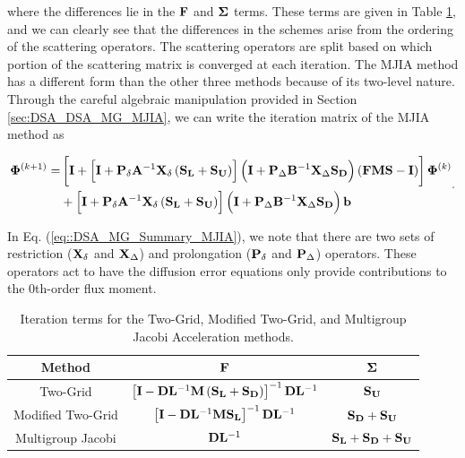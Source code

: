 \noindent where the differences lie in the ${\bf F}$ and  ${\bf \Sigma}$ terms. These terms are given in Table \ref{tab::DSA_DSA_MG_Summary_diffterms}, and we can clearly see that the differences in the schemes arise from the ordering of the scattering operators. The scattering operators are split based on which portion of the scattering matrix is converged at each iteration. The MJIA method has a different form than the other three methods because of its two-level nature. Through the careful algebraic manipulation provided in Section \ref{sec:DSA_DSA_MG_MJIA}, we can write the iteration matrix of the MJIA method as

\begin{equation}
\label{eq::DSA_MG_Summary_MJIA}
\begin{aligned}
{\bf \Phi}^{(k+1)} = & \left[ {\bf I} +\left[ {\bf I}+ {\bf P}_{\delta}{\bf A}^{-1}  {\bf X}_{\delta}\left(   {\bf S_L} +  {\bf S_U} \right) \right]    \left(  {\bf I} + {\bf P}_{\Delta} {\bf B}^{-1} {\bf X}_{\Delta} {\bf S_D} \right) \left(   {\bf F}  {\bf M} {\bf S}  - {\bf I} \right)   \right]{\bf \Phi}^{(k)} \\
&+  \left[ {\bf I}+ {\bf P}_{\delta}{\bf A}^{-1}  {\bf X}_{\delta}\left(   {\bf S_L} +  {\bf S_U} \right) \right]  \left(  {\bf I} + {\bf P}_{\Delta} {\bf B}^{-1} {\bf X}_{\Delta} {\bf S_D} \right) {\bf b} \\
\end{aligned} .
\end{equation}

\noindent In Eq. (\ref{eq::DSA_MG_Summary_MJIA}), we note that there are two sets of restriction (${\bf X}_{\delta}$ and ${\bf X}_{\Delta}$) and prolongation (${\bf P}_{\delta}$ and ${\bf P}_{\Delta}$) operators. These operators act to have the diffusion error equations only provide contributions to the 0th-order flux moment.

\begin{table}
\centering
\caption{Iteration terms for the Two-Grid, Modified Two-Grid, and Multigroup Jacobi Acceleration methods.}
\def\arraystretch{1.5}
\begin{tabular}{|c||c|c|} \hline
Method & ${\bf F}$ & ${\bf \Sigma}$ \\ \hline \hline
Two-Grid & $\left[ {\bf I} - {\bf D}{\bf L}^{-1} {\bf M} \left(  {\bf S_L} + {\bf S_D} \right) \right]^{-1} {\bf D}{\bf L}^{-1}$ & ${\bf S_{U}}$ \\ \hline
Modified Two-Grid & $\left[ {\bf I} - {\bf D}{\bf L}^{-1} {\bf M}{\bf S_L}\right]^{-1} {\bf D}{\bf L}^{-1}$ & ${\bf S_{D}} + {\bf S_{U}}$ \\ \hline
Multigroup Jacobi & ${\bf D}{\bf L}^{-1}$ & ${\bf S_{L}} + {\bf S_{D}} + {\bf S_{U}}$ \\ \hline
\end{tabular}
\label{tab::DSA_DSA_MG_Summary_diffterms}
\end{table}



